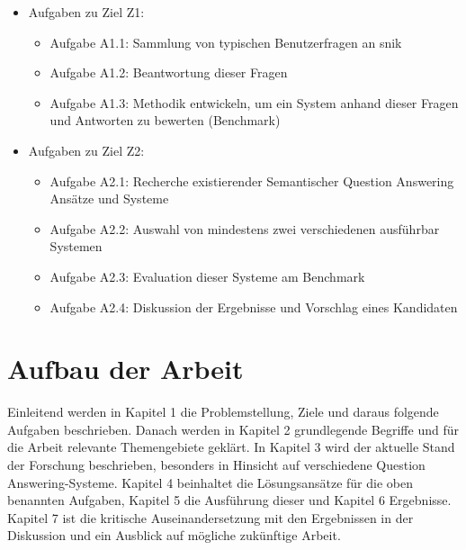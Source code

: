 \begin{itemize}

	\item Aufgaben zu Ziel Z1:
	\begin{itemize}
		\item Aufgabe A1.1: Sammlung von typischen Benutzerfragen an \ac{snik}
		\item Aufgabe A1.2: Beantwortung dieser Fragen
		\item Aufgabe A1.3: Methodik entwickeln, um ein System anhand dieser Fragen und Antworten zu bewerten (Benchmark)
	\end{itemize}
	\item Aufgaben zu Ziel Z2:
	\begin{itemize}
		\item Aufgabe A2.1: Recherche existierender Semantischer Question Answering Ansätze und Systeme
		\item Aufgabe A2.2: Auswahl von mindestens zwei verschiedenen ausführbar Systemen
		\item Aufgabe A2.3: Evaluation dieser Systeme am Benchmark
		\item Aufgabe A2.4: Diskussion der Ergebnisse und Vorschlag eines Kandidaten
	\end{itemize}
\end{itemize}

\section{Aufbau der Arbeit}

Einleitend werden in Kapitel 1 die Problemstellung, Ziele und daraus folgende Aufgaben beschrieben.
Danach werden in Kapitel 2 grundlegende Begriffe und für die Arbeit relevante Themengebiete geklärt.
In Kapitel 3 wird der aktuelle Stand der Forschung beschrieben, besonders in Hinsicht auf verschiedene Question Answering-Systeme.
Kapitel 4 beinhaltet die Lösungsansätze für die oben benannten Aufgaben, Kapitel 5 die Ausführung dieser und Kapitel 6 Ergebnisse.
Kapitel 7 ist die kritische Auseinandersetzung mit den Ergebnissen in der Diskussion und ein Ausblick auf mögliche zukünftige Arbeit.
